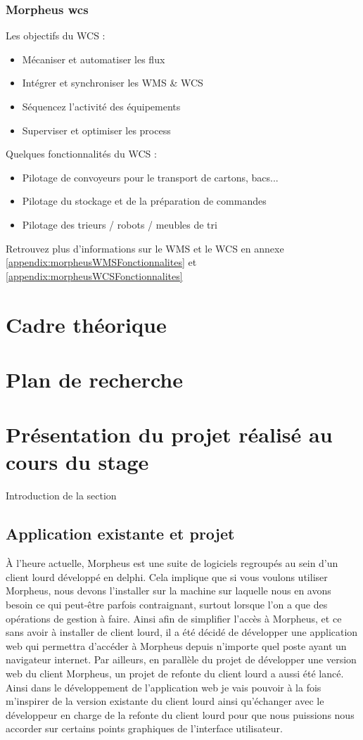 \documentclass[a4paper, 12pt, french]{article}
\newcommand{\bdot}{\item[\color{ssiYellow}\ding{108}]}
\begin{document}
			\subsubsection{Morpheus \acrshort{wcs}}
				\noindent
				Les objectifs du WCS :
				\begin{itemize}
					\bdot{Mécaniser et automatiser les flux}
					\bdot{Intégrer et synchroniser les WMS \& WCS}
					\bdot{Séquencez l'activité des équipements}
					\bdot{Superviser et optimiser les process}
				\end{itemize}
				\vspace{\baselineskip}
				Quelques fonctionnalités du WCS :
				\begin{itemize}
					\bdot{Pilotage de convoyeurs pour le transport de cartons, bacs...}
					\bdot{Pilotage du stockage et de la préparation de commandes}
					\bdot{Pilotage des trieurs / robots / meubles de tri}
				\end{itemize}
				\vspace{\baselineskip}
			Retrouvez plus d'informations sur le WMS et le WCS en annexe \ref{appendix:morpheusWMSFonctionnalites} et \ref{appendix:morpheusWCSFonctionnalites}

	\section{Cadre théorique}
			

	\section{Plan de recherche}

	\section{Présentation du projet réalisé au cours du stage}%
		Introduction de la section

		\subsection{Application existante et projet}%
	À l'heure actuelle, Morpheus est une suite de logiciels regroupés au sein d'un client lourd développé en delphi. Cela implique que si vous voulons utiliser Morpheus, nous devons l'installer sur la machine sur laquelle nous en avons besoin ce qui peut-être parfois contraignant, surtout lorsque l'on a que des opérations de gestion à faire. Ainsi afin de simplifier l'accès à Morpheus, et ce sans avoir à installer de client lourd, il a été décidé de développer une application web qui permettra d'accéder à Morpheus depuis n'importe quel poste ayant un navigateur internet. Par ailleurs, en parallèle du projet de développer une version web du client Morpheus, un projet de refonte du client lourd a aussi été lancé. Ainsi dans le développement de l'application web je vais pouvoir à la fois m'inspirer de la version existante du client lourd ainsi qu'échanger avec le développeur en charge de la refonte du client lourd pour que nous puissions nous accorder sur certains points graphiques de l'interface utilisateur.
\end{document}
